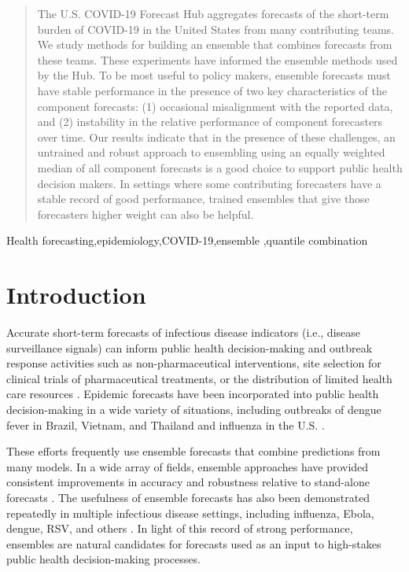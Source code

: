 \documentclass[11pt,3p,review,authoryear]{elsarticle}
\begin{document}
\begin{frontmatter}
\begin{abstract}
The U.S. COVID-19 Forecast Hub aggregates forecasts of the short-term burden of
COVID-19 in the United States from many contributing teams. We study methods for
building an ensemble that combines forecasts from these teams. These experiments
have informed the ensemble methods used by the Hub. To be most useful to policy
makers, ensemble forecasts must have stable performance in the presence of two
key characteristics of the component forecasts: (1) occasional misalignment with
the reported data, and (2) instability in the relative performance of component
forecasters over time. Our results indicate that in the presence of these
challenges, an untrained and robust approach to ensembling using an equally
weighted median of all component forecasts is a good choice to support public
health decision makers. In settings where some contributing forecasters have a
stable record of good performance, trained ensembles that give those forecasters
higher weight can also be helpful.
\end{abstract}

\begin{keyword}
Health forecasting\sep epidemiology\sep COVID-19\sep ensemble \sep quantile combination
\end{keyword}

\end{frontmatter}

\section{Introduction}

Accurate short-term forecasts of infectious disease indicators (i.e., disease surveillance signals) can inform public health decision-making and outbreak response activities such as non-pharmaceutical interventions, site selection for clinical trials of pharmaceutical treatments, or the distribution of limited health care resources \citep{wallinga_optimizing_2010, lipsitch_improving_2011, dean_ensemble_2020}.
Epidemic forecasts have been incorporated into public health decision-making in a wide variety of situations, including outbreaks of dengue fever in Brazil, Vietnam, and Thailand \citep{Rlowe2016,colon-gonzalez_probabilistic_2021,reich_challenges_2016} and
influenza in the U.S. \citep{mcgowan_collaborative_2019}.

These efforts frequently use ensemble forecasts that combine predictions from many models.
In a wide array of fields, ensemble approaches have provided consistent improvements in accuracy and robustness relative to stand-alone forecasts \citep{gneiting_weather_2005, polikar_ensemble_2006}.
The usefulness of ensemble forecasts has also been demonstrated repeatedly in multiple infectious disease settings, including influenza, Ebola, dengue, RSV, and others \citep{yamanaSuperensembleForecastsDengue2016, viboud_rapidd_2018, mcgowan_collaborative_2019, johansson_open_2019, reis_superensemble_2019, reich_accuracy_2019}.
In light of this record of strong performance, ensembles are natural candidates for forecasts used as an input to high-stakes public health decision-making processes.
\end{document}
